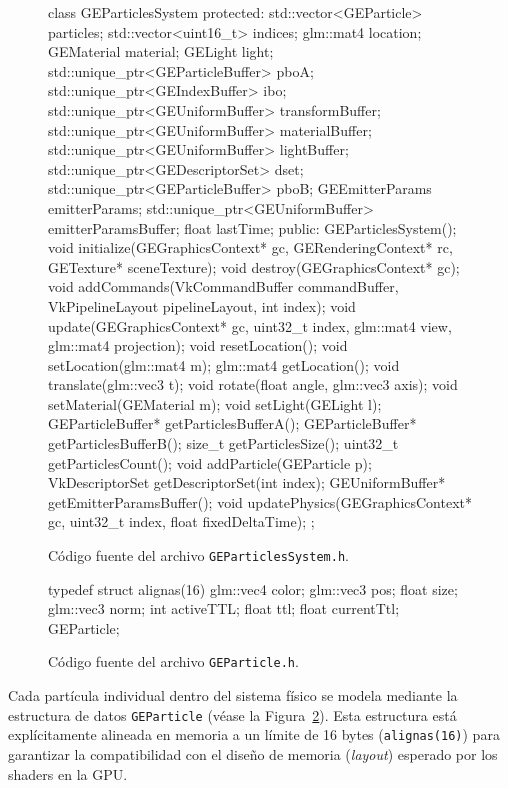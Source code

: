 \begin{figure}[!htbp]
    \centering
\begin{carbonbox}
class GEParticlesSystem {
protected:
    std::vector<GEParticle> particles;
    std::vector<uint16_t> indices;
    glm::mat4 location;
    GEMaterial material;
    GELight light;
    std::unique_ptr<GEParticleBuffer> pboA;
    std::unique_ptr<GEIndexBuffer> ibo;
    std::unique_ptr<GEUniformBuffer> transformBuffer;
    std::unique_ptr<GEUniformBuffer> materialBuffer;
    std::unique_ptr<GEUniformBuffer> lightBuffer;
    std::unique_ptr<GEDescriptorSet> dset;
    std::unique_ptr<GEParticleBuffer> pboB;
    GEEmitterParams emitterParams;
    std::unique_ptr<GEUniformBuffer> emitterParamsBuffer;
    float lastTime;
public:
    GEParticlesSystem();
    void initialize(GEGraphicsContext* gc, GERenderingContext* rc, GETexture* sceneTexture);
    void destroy(GEGraphicsContext* gc);
    void addCommands(VkCommandBuffer commandBuffer, VkPipelineLayout pipelineLayout, int index);
    void update(GEGraphicsContext* gc, uint32_t index, glm::mat4 view, glm::mat4 projection);
    void resetLocation();
    void setLocation(glm::mat4 m);
    glm::mat4 getLocation();
    void translate(glm::vec3 t);
    void rotate(float angle, glm::vec3 axis);
    void setMaterial(GEMaterial m);
    void setLight(GELight l);
    GEParticleBuffer* getParticlesBufferA();
    GEParticleBuffer* getParticlesBufferB();
    size_t getParticlesSize();
    uint32_t getParticlesCount();
    void addParticle(GEParticle p);
    VkDescriptorSet getDescriptorSet(int index);
    GEUniformBuffer* getEmitterParamsBuffer();
    void updatePhysics(GEGraphicsContext* gc, uint32_t index, float fixedDeltaTime);
};
\end{carbonbox}
    \caption{Código fuente del archivo \texttt{GEParticlesSystem.h}.}
    \label{fig:geparticlessystem_code}
\end{figure}


\begin{figure}[!htbp]
    \centering
\begin{carbonbox}
typedef struct alignas(16)
{
    glm::vec4 color;      
    glm::vec3 pos;        
    float size;           
    glm::vec3 norm;       
    int activeTTL;        
    float ttl;            
    float currentTtl;     
} GEParticle;
\end{carbonbox}
    \caption{Código fuente del archivo \texttt{GEParticle.h}.}
    \label{fig:geparticle_code}
\end{figure}

\vspace{2\baselineskip}
Cada partícula individual dentro del sistema físico se modela mediante la estructura de datos \texttt{GEParticle} (véase la Figura~\ref{fig:geparticle_code}). Esta estructura está explícitamente alineada en memoria a un límite de 16 bytes (\texttt{alignas(16)}) para garantizar la compatibilidad con el diseño de memoria (\textit{layout}) esperado por los shaders en la GPU.                    

